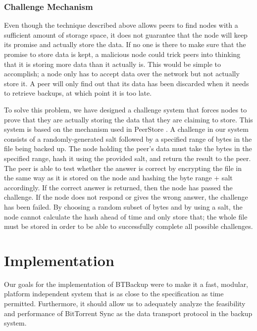 \documentclass[12pt]{report}
\begin{document}
\subsection{Challenge Mechanism} \label{subsec:ChallengeMechanism_sec:Fairness_chap:BTBackup}
Even though the technique described above allows peers to find nodes with a sufficient amount of storage space, it does not guarantee that the node will keep its promise and actually store the data. If no one is there to make sure that the promise to store data is kept, a malicious node could trick peers into thinking that it is storing more data than it actually is. This would be simple to accomplish; a node only has to accept data over the network but not actually store it. A peer will only find out that its data has been discarded when it needs to retrieve backups, at which point it is too late.

To solve this problem, we have designed a challenge system that forces nodes to prove that they are actually storing the data that they are claiming to store. This system is based on the mechanism used in PeerStore \cite{PeerStore}. A challenge in our system consists of a randomly-generated salt followed by a specified range of bytes in the file being backed up. The node holding the peer's data must take the bytes in the specified range, hash it using the provided salt, and return the result to the peer. The peer is able to test whether the answer is correct by encrypting the file in the same way as it is stored on the node and hashing the byte range + salt accordingly. If the correct answer is returned, then the node has passed the challenge. If the node does not respond or gives the wrong answer, the challenge has been failed. By choosing a random subset of bytes and by using a salt, the node cannot calculate the hash ahead of time and only store that; the whole file must be stored in order to be able to successfully complete all possible challenges.


\chapter{Implementation} \label{chap:impl}

Our goals for the implementation of BTBackup were to make it a fast, modular, platform independent system that is as close to the specification as time permitted. Furthermore, it should allow us to adequately analyze the feasibility and performance of BitTorrent Sync as the data transport protocol in the backup system.
\end{document}

